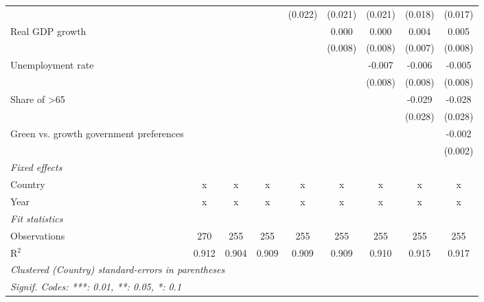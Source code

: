 \begin{table}[htbp]
\begin{tabular}{lcccccccc}
                                              &               &              &         & (0.022) & (0.021) & (0.021) & (0.018) & (0.017)\\   
      Real GDP growth                         &               &              &         &         & 0.000   & 0.000   & 0.004   & 0.005\\   
                                              &               &              &         &         & (0.008) & (0.008) & (0.007) & (0.008)\\   
      Unemployment rate                       &               &              &         &         &         & -0.007  & -0.006  & -0.005\\   
                                              &               &              &         &         &         & (0.008) & (0.008) & (0.008)\\   
      Share of >65                            &               &              &         &         &         &         & -0.029  & -0.028\\   
                                              &               &              &         &         &         &         & (0.028) & (0.028)\\   
      Green vs. growth government preferences &               &              &         &         &         &         &         & -0.002\\   
                                              &               &              &         &         &         &         &         & (0.002)\\   
      \emph{Fixed effects}\\
      Country                                 & x             & x            & x       & x       & x       & x       & x       & x\\  
      Year                                    & x             & x            & x       & x       & x       & x       & x       & x\\  
      \midrule \emph{Fit statistics}\\
      Observations                            & 270           & 255          & 255     & 255     & 255     & 255     & 255     & 255\\  
      R$^2$                                   & 0.912         & 0.904        & 0.909   & 0.909   & 0.909   & 0.910   & 0.915   & 0.917\\  
      \midrule
      \multicolumn{9}{l}{\emph{Clustered (Country) standard-errors in parentheses}}\\
      \multicolumn{9}{l}{\emph{Signif. Codes: ***: 0.01, **: 0.05, *: 0.1}}\\
   \end{tabular}
\end{table}


